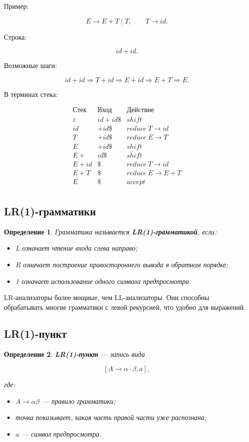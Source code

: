 \documentclass[12pt,a4paper]{article}
\newtheorem{definition}{Определение}
\begin{document}
Пример:

\[
E \to E+T \mid T,\qquad T\to id.
\]

Строка:

\[
id+id.
\]

Возможные шаги:

\[
id+id
\Rightarrow T+id
\Rightarrow E+id
\Rightarrow E+T
\Rightarrow E.
\]

В терминах стека:

\[
\begin{array}{c|c|c}
\text{Стек} & \text{Вход} & \text{Действие} \\
\hline
\varepsilon & id+id\$ & shift \\
id & +id\$ & reduce\ T\to id \\
T & +id\$ & reduce\ E\to T \\
E & +id\$ & shift \\
E+ & id\$ & shift \\
E+id & \$ & reduce\ T\to id \\
E+T & \$ & reduce\ E\to E+T \\
E & \$ & accept \\
\end{array}
\]

\subsection{LR(1)-грамматики}

\begin{definition}
Грамматика называется \textbf{LR(1)-грамматикой}, если:
\begin{itemize}
    \item L означает чтение входа слева направо;
    \item R означает построение правостороннего вывода в обратном порядке;
    \item 1 означает использование одного символа предпросмотра.
\end{itemize}
\end{definition}

LR-анализаторы более мощные, чем LL-анализаторы. Они способны обрабатывать многие грамматики с левой рекурсией, что удобно для выражений.

\subsection{LR(1)-пункт}

\begin{definition}
\textbf{LR(1)-пункт} --- запись вида

\[
[A \to \alpha \cdot \beta, a],
\]

где:
\begin{itemize}
    \item $A \to \alpha\beta$ --- правило грамматики;
    \item точка показывает, какая часть правой части уже распознана;
    \item $a$ --- символ предпросмотра.
\end{itemize}
\end{definition}
\end{document}
